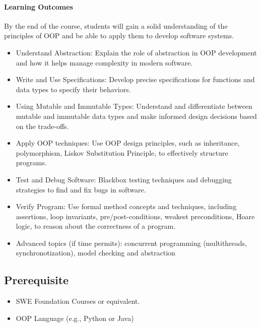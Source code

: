 \documentclass[11pt]{article}
\begin{document}
\paragraph{Learning Outcomes}
By the end of the course, students will gain a solid understanding of the principles of OOP and be able to apply them to develop software systems.
\begin{itemize}
\item Understand Abstraction: Explain the role of abstraction in OOP development and how it helps manage complexity in modern software.
\item Write and Use Specifications: Develop precise specifications for functions and data types to specify their behaviors.
\item Using Mutable and Immutable Types: Understand and differentiate between mutable and immutable data types and make informed design decisions based on the trade-offs.
\item Apply OOP techniques: Use OOP design principles, such as inheritance, polymorphism, Liskov Substitution Principle, to effectively structure programs.
\item Test and Debug Software: Blackbox testing techniques and debugging strategies to find and fix bugs in software.
\item Verify Program: Use formal method concepts and techniques, including assertions, loop invariants, pre/post-conditions, weakest preconditions, Hoare logic, to reason about the correctness of a program.
\item Advanced topics (if time permits): concurrent programming (multithreads, synchronotization), model checking and abstraction
\end{itemize}

\subsection{Prerequisite}
\begin{itemize}
\item SWE Foundation Courses or equivalent.
\item OOP Language (e.g., Python or Java)
\end{itemize}
\end{document}
